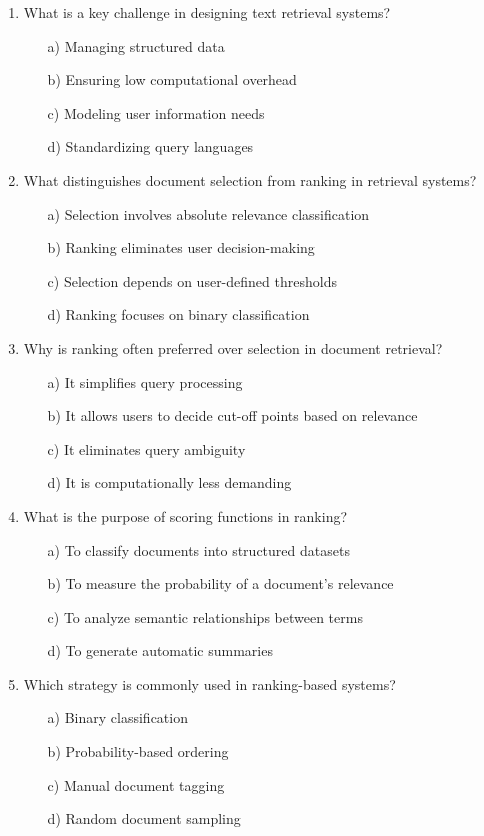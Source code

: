 \documentclass[8pt]{extarticle}
\begin{document}
\begin{multicols}{2}
\begin{enumerate}
\item What is a key challenge in designing text retrieval systems?
\begin{itemize}
    \item[a)] Managing structured data
    \item[b)] Ensuring low computational overhead
    \item[c)] Modeling user information needs
    \item[d)] Standardizing query languages
\end{itemize}

\item What distinguishes document selection from ranking in retrieval systems?
\begin{itemize}
    \item[a)] Selection involves absolute relevance classification
    \item[b)] Ranking eliminates user decision-making
    \item[c)] Selection depends on user-defined thresholds
    \item[d)] Ranking focuses on binary classification
\end{itemize}

\item Why is ranking often preferred over selection in document retrieval?
\begin{itemize}
    \item[a)] It simplifies query processing
    \item[b)] It allows users to decide cut-off points based on relevance
    \item[c)] It eliminates query ambiguity
    \item[d)] It is computationally less demanding
\end{itemize}

\item What is the purpose of scoring functions in ranking?
\begin{itemize}
    \item[a)] To classify documents into structured datasets
    \item[b)] To measure the probability of a document's relevance
    \item[c)] To analyze semantic relationships between terms
    \item[d)] To generate automatic summaries
\end{itemize}

\item Which strategy is commonly used in ranking-based systems?
\begin{itemize}
    \item[a)] Binary classification
    \item[b)] Probability-based ordering
    \item[c)] Manual document tagging
    \item[d)] Random document sampling
\end{itemize}


\end{enumerate}
\end{multicols}
\end{document}
